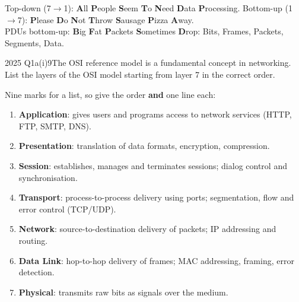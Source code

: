 \documentclass[10pt]{article}
\begin{document}
\begin{mnemonic}
Top-down (7$\to$1): \textbf{A}ll \textbf{P}eople \textbf{S}eem \textbf{T}o \textbf{N}eed \textbf{D}ata \textbf{P}rocessing.\quad
Bottom-up (1$\to$7): \textbf{P}lease \textbf{D}o \textbf{N}ot \textbf{T}hrow \textbf{S}ausage \textbf{P}izza \textbf{A}way.\\
PDUs bottom-up: \textbf{B}ig \textbf{F}at \textbf{P}ackets \textbf{S}ometimes \textbf{D}rop: Bits, Frames, Packets, Segments, Data.
\end{mnemonic}

\begin{pastq}{2025 Q1a(i)}{9}The OSI reference model is a fundamental concept in networking. List the layers of the OSI model starting from layer 7 in the correct order.\end{pastq}
\begin{ans}
Nine marks for a list, so give the order \textbf{and} one line each:
\begin{enumerate}
\item[\textbf{L7}] \textbf{Application}: gives users and programs access to network services (HTTP, FTP, SMTP, DNS).
\item[\textbf{L6}] \textbf{Presentation}: translation of data formats, encryption, compression.
\item[\textbf{L5}] \textbf{Session}: establishes, manages and terminates sessions; dialog control and synchronisation.
\item[\textbf{L4}] \textbf{Transport}: process-to-process delivery using ports; segmentation, flow and error control (TCP/UDP).
\item[\textbf{L3}] \textbf{Network}: source-to-destination delivery of packets; IP addressing and routing.
\item[\textbf{L2}] \textbf{Data Link}: hop-to-hop delivery of frames; MAC addressing, framing, error detection.
\item[\textbf{L1}] \textbf{Physical}: transmits raw bits as signals over the medium.
\end{enumerate}
\end{ans}
\end{document}
